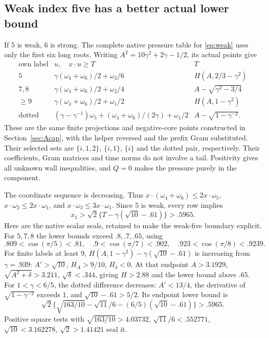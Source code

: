 \documentclass[11pt]{article}
\theoremstyle{remark}
\begin{document}
\subsection{Weak index five has a better actual lower bound}

If \(5\) is weak, \(6\) is strong. The complete native pressure
table for \eqref{eq:weak} uses only the first six long roots.
Writing \(A^2=10\gamma^2+2\gamma-1/2\), its actual points give
\[
\begin{array}{c|c|c}
 \text{own label}&u,\quad x\cdot u\ge T&T\\ \hline
 5&\gamma(\omega_4+\omega_6)/2+\omega_3/6&
                  H(A,2/3-\gamma^2)\\
 7,8&\gamma(\omega_4+\omega_6)/2+\omega_2/4&
                  A-\sqrt{\gamma^2-3/4}\\
 \ge9&\gamma(\omega_4+\omega_6)/2+\omega_1/2&
                  H(A,1-\gamma^2)\\
 \text{dotted}&(\gamma-\gamma^{-1})\omega_5+
       (\omega_4+\omega_6)/(2\gamma)+\omega_1/2&
                  A-\sqrt{1-\gamma^{-2}} .
\end{array}
\]
These are the same finite projections and negative-core points
constructed in Section~\ref{sec:Acap}, with the helper reversed
and the prefix Gram substituted. Their selected sets are
$\{i,1,2\}$, $\{i,1\}$, $\{i\}$ and the dotted pair,
respectively. Their coefficients, Gram matrices and time norms do
not involve a tail. Positivity gives all unknown
wall inequalities, and \(Q=0\) makes the pressure purely in the
component.

The coordinate sequence is decreasing. Thus
\(x\cdot(\omega_4+\omega_6)\le2x\cdot\omega_5\),
\(x\cdot\omega_2\le2x\cdot\omega_1\), and
\(x\cdot\omega_3\le3x\cdot\omega_1\).
Since \(5\) is weak, every row implies
\[
 x_1>\sqrt2\{T-\gamma(\sqrt{10}-.61)\}>.5965.
\]
Here are the native scalar seals, retained to make the weak-five
boundary explicit. For \(5,7,8\) the lower bounds exceed
\(.8,.7,.65\), using
\[
 .809<\cos(\pi/5)<.81,\quad .9<\cos(\pi/7)<.902,\quad
 .923<\cos(\pi/8)<.9239 .
\]
For finite labels at least \(9\), \(H(A,1-\gamma^2)
-\gamma(\sqrt{10}-.61)\) is increasing from \(\gamma=.939\):
\(A'>\sqrt{10}\), \(H_A>9/10\), \(H_\delta<0\).
At that endpoint \(A>3.1929\),
\(\sqrt{A^2+\delta}>3.211\), \(\sqrt\delta<.344\), giving
\(H>2.88\) and the lower bound above \(.65\).
For \(1<\gamma<6/5\), the dotted difference decreases:
\(A'<13/4\), the derivative of \(\sqrt{1-\gamma^{-2}}\)
exceeds \(1\), and \(\sqrt{10}-.61>5/2\).
Its endpoint lower bound is
\[
 \sqrt2\{\sqrt{163/10}-\sqrt{11}/6
                  -(6/5)(\sqrt{10}-.61)\}>.5965 .
\]
Positive square tests with
\(\sqrt{163/10}>4.03732\), \(\sqrt{11}/6<.552771\),
\(\sqrt{10}<3.162278\), \(\sqrt2>1.41421\) seal it.
\end{document}

